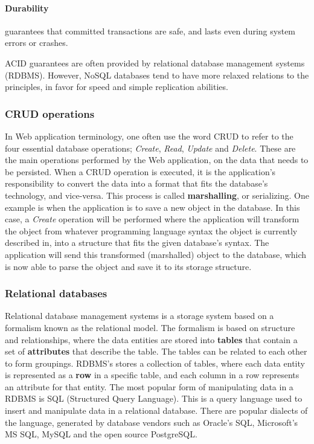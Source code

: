 \paragraph{Durability} guarantees that committed transactions are safe, and lasts even during system errors or crashes. 

ACID guarantees are often provided by relational database management systems (RDBMS). However, NoSQL databases tend to have more relaxed relations to the principles, in favor for speed and simple replication abilities. 

\subsubsection{CRUD operations}
In Web application terminology, one often use the word CRUD to refer to the four essential  database operations; \textit{Create}, \textit{Read}, \textit{Update} and \textit{Delete}. These are the main operations performed by the Web application, on the data that needs to be persisted. When a CRUD operation is executed, it is the application's responsibility to convert the data into a format that fits the database's technology, and vice-versa. This process is called \textbf{marshalling}, or serializing. One example is when the application is to save a new object in the database. In this case, a \textit{Create} operation will be performed where the application will transform the object from whatever programming language syntax the object is currently described in, into a structure that fits the given database's syntax. The application will send this transformed (marshalled) object to the database, which is now able to parse the object and save it to its storage structure.   

\subsubsection{Relational databases}
Relational database management systems is a storage system based on a formalism known as the relational model. The formalism is based on structure and relationships, where the data entities are stored into \textbf{tables} that contain a set of \textbf{attributes} that describe the table. The tables can be related to each other to form groupings. RDBMS's stores a collection of tables, where each data entity is represented as a \textbf{row} in a specific table, and each column in a row represents an attribute for that entity. The most popular form of manipulating data in a RDBMS is SQL (Structured Query Language)\cite{sql}. This is a query language used to insert and manipulate data in a relational database. There are popular dialects of the language, generated by database vendors such as Oracle's SQL\cite{oracle}, Microsoft's MS SQL\cite{mssql}, MySQL\cite{mysql} and the open source PostgreSQL\cite{postgresql}.


